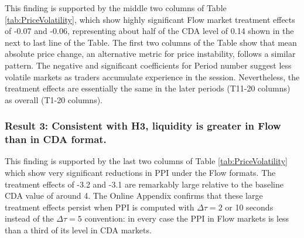 \documentclass[12pt]{article}
\begin{document}
This finding is supported by the middle two columns of Table \ref{tab:PriceVolatility}, which show highly significant Flow market treatment effects
of -0.07 and -0.06, representing about half of the CDA level of 0.14 shown in the next to last line of the Table. The first two columns of the Table show that mean absolute price change, an alternative metric for price instability, follows a similar pattern.  
The negative and significant coefficients for Period number suggest less volatile markets as traders accumulate experience in the session. 
Nevertheless, the treatment effects are essentially the same in the later periods (T11-20 columns) as overall (T1-20 columns).

\subsubsection*{Result 3: Consistent with H3, liquidity is greater in Flow than in  CDA format.}

This finding is supported by the last two columns of Table \ref{tab:PriceVolatility} which show very significant reductions in PPI under the Flow formats. The treatment effects of -3.2 and -3.1 are remarkably large relative to the baseline CDA value of around 4. 
The Online Appendix  confirms that 
these large treatment effects persist when PPI 
is computed with $\Delta \tau = 2$ or 10 seconds instead of the $\Delta \tau = 5$ convention: in every case
the PPI in Flow markets is less than a third of its level in CDA markets.
\end{document}
